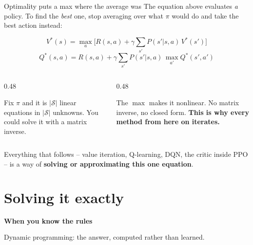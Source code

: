 \documentclass[aspectratio=169]{beamer}
\begin{document}
\begin{frame}{Optimality puts a max where the average was}
  \small
  The equation above evaluates \emph{a} policy. To find the \emph{best} one, stop averaging over
  what $\pi$ would do and take the best action instead:

  \vskip 4pt
  \begin{center}
  \begin{tcolorbox}[colback=armblue!8, colframe=armblue, boxrule=0.7pt, arc=2pt, width=0.86\textwidth]
    \[ V^*(s) = \max_a \Big[ R(s,a) + \gamma \sum_{s'} P(s'|s,a)\, V^*(s') \Big] \]
    \vskip -6pt
    \[ Q^*(s,a) = R(s,a) + \gamma \sum_{s'} P(s'|s,a)\, \max_{a'} Q^*(s',a') \]
  \end{tcolorbox}
  \end{center}

  \vskip 6pt
  \begin{columns}[T]
    \begin{column}{0.48\textwidth}
      \begin{tcolorbox}[colback=paramgreen!8, colframe=paramgreen, boxrule=0.6pt, arc=2pt,
                        title={\textbf{Expectation equation: linear}}]
        \small
        Fix $\pi$ and it is $|\mathcal{S}|$ linear equations in $|\mathcal{S}|$ unknowns.
        You could solve it with a matrix inverse.
      \end{tcolorbox}
    \end{column}
    \begin{column}{0.48\textwidth}
      \begin{tcolorbox}[colback=armred!8, colframe=armred, boxrule=0.6pt, arc=2pt,
                        title={\textbf{Optimality equation: not}}]
        \small
        The $\max$ makes it nonlinear. No matrix inverse, no closed form. \textbf{This is why
        every method from here on iterates.}
      \end{tcolorbox}
    \end{column}
  \end{columns}

  \vskip 8pt
  \begin{center}
    \small
    Everything that follows -- value iteration, Q-learning, DQN, the critic inside PPO --
    is a way of \textbf{solving or approximating this one equation}.
  \end{center}
\end{frame}

\section{Solving it exactly}
\begin{frame}[plain]
  \begin{center}
    \vskip 1.6cm
    {\Huge\bfseries\color{popblue}When you know the rules}

    \vskip 0.6cm
    {\large Dynamic programming: the answer, computed rather than learned.}
  \end{center}
\end{frame}
\end{document}
